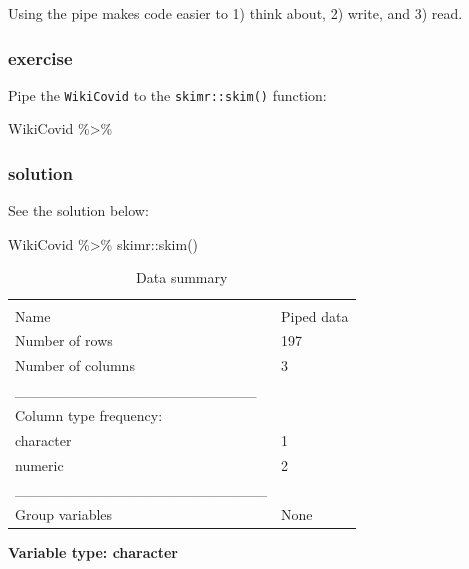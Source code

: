 \documentclass[11pt,]{article}
\newenvironment{Shaded}{\begin{snugshade}}{\end{snugshade}}
\newcommand{\FunctionTok}[1]{\textcolor[rgb]{0.00,0.00,0.00}{#1}}
\newcommand{\NormalTok}[1]{#1}
\newcommand{\SpecialCharTok}[1]{\textcolor[rgb]{0.00,0.00,0.00}{#1}}
\let\oldShaded\Shaded
\let\endoldShaded\endShaded
\renewenvironment{Shaded}{\footnotesize\oldShaded}{\endoldShaded}
\begin{document}
Using the pipe makes code easier to 1) think about, 2) write, and 3)
read.

\hypertarget{exercise-6}{%
\subsubsection{exercise}\label{exercise-6}}

Pipe the \texttt{WikiCovid} to the \texttt{skimr::skim()} function:

\begin{Shaded}
\begin{Highlighting}[]
\NormalTok{WikiCovid }\SpecialCharTok{\%\textgreater{}\%} 
\end{Highlighting}
\end{Shaded}

\hypertarget{solution-6}{%
\subsubsection{solution}\label{solution-6}}

See the solution below:

\begin{Shaded}
\begin{Highlighting}[]
\NormalTok{WikiCovid }\SpecialCharTok{\%\textgreater{}\%}\NormalTok{ skimr}\SpecialCharTok{::}\FunctionTok{skim}\NormalTok{()}
\end{Highlighting}
\end{Shaded}

\begin{longtable}[]{@{}ll@{}}
\caption{Data summary}\tabularnewline
\toprule
& \\
\midrule
\endfirsthead
\toprule
& \\
\midrule
\endhead
Name & Piped data \\
Number of rows & 197 \\
Number of columns & 3 \\
\_\_\_\_\_\_\_\_\_\_\_\_\_\_\_\_\_\_\_\_\_\_\_ & \\
Column type frequency: & \\
character & 1 \\
numeric & 2 \\
\_\_\_\_\_\_\_\_\_\_\_\_\_\_\_\_\_\_\_\_\_\_\_\_ & \\
Group variables & None \\
\bottomrule
\end{longtable}

\textbf{Variable type: character}
\end{document}
